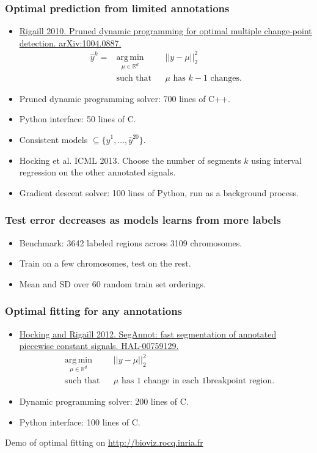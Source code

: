 \documentclass{beamer}
\newcommand{\argmin}{\operatorname*{arg\, min}}
\newcommand{\RR}{\mathbb R}
\begin{document}
  \begin{frame}
    \frametitle{Optimal prediction from limited annotations}
    \begin{itemize}
    \item \href{http://arxiv.org/abs/1004.0887}{Rigaill 2010. Pruned
        dynamic programming for optimal multiple change-point
        detection. arXiv:1004.0887.}
    $$
    \begin{aligned}
      \hat y^k = &\argmin_{\mu\in\RR^d} && ||y-\mu||^2_2\\
      &\text{such that} && \text{$\mu$ has $k-1$ changes.}
    \end{aligned}
    $$
    \item Pruned dynamic programming solver: 700 lines of C++.
    \item Python interface: 50 lines of C.
    \item Consistent models $\subseteq\{\hat y^1,\dots,\hat y^{20}\}$.
    \item Hocking et al. ICML 2013. Choose the number of segments $k$ using
      interval regression on the other annotated signals.
    \item Gradient descent solver: 100 lines of Python, run as a
      background process.
    \end{itemize}
  \end{frame}

  \begin{frame}
    \frametitle{Test error decreases as models learns from more
      labels}
    \begin{itemize}
    \item Benchmark: 3642 labeled regions across 3109 chromosomes.
    \item Train on a few chromosomes, test on the rest.
    \item Mean and SD over 60 random train set orderings.
    \end{itemize}
    
  \end{frame}

  \begin{frame}
    \frametitle{Optimal fitting for any annotations}
    \begin{itemize}
    \item \href{http://hal.inria.fr/hal-00759129/}{Hocking and Rigaill
        2012. SegAnnot: fast segmentation of
        annotated piecewise constant signals. HAL-00759129.}
    $$
    \begin{aligned}
      &\argmin_{\mu\in\RR^d} && ||y-\mu||^2_2\\
      &\text{such that} && \text{$\mu$ has 1 change in each
        1breakpoint region.}
    \end{aligned}
    $$
    \item Dynamic programming solver: 200 lines of C.
    \item Python interface: 100 lines of C.
    \end{itemize}
    
      Demo of optimal fitting on \url{http://bioviz.rocq.inria.fr}
  \end{frame}
\end{document}
